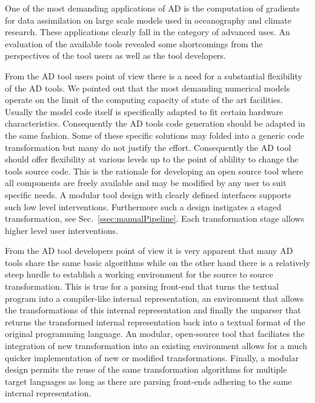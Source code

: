 \documentclass[11pt]{article}
\newcommand{\refsec}[1]{{Sec.~\ref{#1}}}
\begin{document}
One of the most demanding applications of AD is the computation of gradients for 
data assimilation on large scale models used in oceanography and climate research. 
These applications clearly fall in the category of advanced uses.
An evaluation of the available tools revealed some shortcomings from the perspectives 
of the tool users as well as the tool developers. 

From  the AD tool  users point of view there is a need for a substantial 
flexibility of the AD tools. We pointed out that the most demanding  numerical models 
operate on the limit of the computing capacity of state of the art facilities. 
Usually the model code itself is specifically adapted to fit certain 
hardware characteristics. 
Consequently the AD tools code generation should be adapted in the same fashion. 
Some of these specific solutions may folded into a generic code transformation but 
many do not justify the effort. 
Consequently the AD tool should offer flexibility at various  levels  up to the 
point of ablility to change the tools source code. 
This is the rationale for developing an open source tool where all 
components are freely available and may be modified by any user to suit specific 
needs.  
A modular tool design with clearly defined interfaces supports such 
low level interventions. Furthermore such a design instigates a staged 
transformation, see \refsec{ssec:manualPipeline}. 
Each transformation stage allows higher level user interventions. 

From the AD tool developers point of view it is very apparent that 
many AD tools share the same basic algorithms while on the other hand 
there is a relatively steep hurdle to establish a working environment 
for the source to source transformation. 
This is true for a parsing front-end that turns the textual program into a 
compiler-like internal representation,  an environment that allows the 
transformations  of this internal representation and finally the unparser that 
returns the transformed internal representation back into a textual format of the 
original programming language. An modular, open-source tool that faciliates 
the integration of new transformation into an existing environment 
allows for a much quicker implementation of new or modified  transformations.
Finally, a modular design permits the reuse of the same transformation algorithms 
for multiple target languages as long as there are parsing front-ends adhering to the 
same internal representation.
\end{document}
